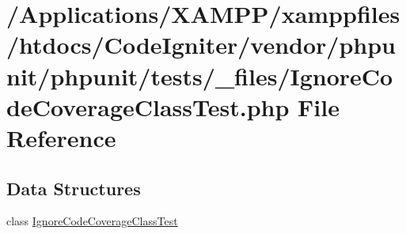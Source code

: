 \hypertarget{_ignore_code_coverage_class_test_8php}{}\section{/\+Applications/\+X\+A\+M\+P\+P/xamppfiles/htdocs/\+Code\+Igniter/vendor/phpunit/phpunit/tests/\+\_\+files/\+Ignore\+Code\+Coverage\+Class\+Test.php File Reference}
\label{_ignore_code_coverage_class_test_8php}
\subsection*{Data Structures}
\begin{DoxyCompactItemize}
\item 
class \mbox{\hyperlink{class_ignore_code_coverage_class_test}{Ignore\+Code\+Coverage\+Class\+Test}}
\end{DoxyCompactItemize}
